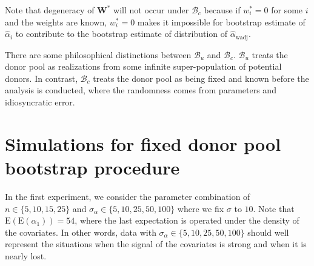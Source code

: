 \documentclass[11pt]{article}
\def\mrm#1{\mathrm{#1}} %
\def\mc#1{\mathcal{#1}} %
\def\E#1{\mathrm{E}(#1)} %
\theoremstyle{definition}
\begin{document}
Note that degeneracy of $\mathbf{W}^*$ will not occur under $\mc{B}_c$ because  if $w_i^*=0$ for some $i$ and the weights are known, $w_i^*=0$ makes it impossible for bootstrap estimate of $\hat{\alpha}_i$ to contribute to the bootstrap estimate of distribution of $\hat{\alpha}_{\mrm{wadj}}$. 


There are some philosophical distinctions between $\mc{B}_u$  and $\mc{B}_c$. $\mc{B}_u$ treats the donor pool as realizations from some infinite super-population of potential donors. In contrast, $\mc{B}_c$ treats the donor pool as being fixed  and known before the analysis is conducted, where the randomness comes from parameters and idiosyncratic error. 




\section{Simulations for fixed donor pool bootstrap procedure}
\label{simulationappendix}


In the first experiment, we consider the parameter combination of  $n \in \{5, 10, 15, 25\}$ and $\sigma_{\alpha} \in  \{5, 10, 25, 50, 100\}$ where we fix $\sigma$ to $10$. Note that $\E{\E{\alpha_1}}=54$, where the last expectation is operated under the density of the covariates. In other words, data with $\sigma_{\alpha} \in  \{5, 10, 25, 50, 100\}$  should well represent the situations when the signal of the covariates is strong and when it is nearly lost.
\end{document}
